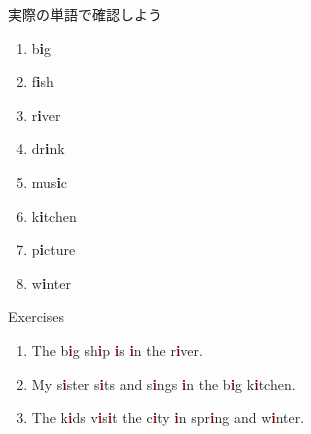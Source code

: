 \documentclass[aspectratio=169,xcolor={dvipsnames,table}]{beamer}
\begin{document}
\begin{frame}[plain]{実際の単語で確認しよう}
\LARGE

\begin{enumerate}
 \item b\textcolor{NavyBlue}{\bfseries i}g%
\hfill{}\hspace{150pt}\mbox{}
 \item f\textcolor{NavyBlue}{\bfseries i}sh%
\hfill{}\hspace{150pt}\mbox{}
 \item r\textcolor{NavyBlue}{\bfseries i}ver%
\hfill{}\hspace{150pt}\mbox{}
 \item dr\textcolor{NavyBlue}{\bfseries i}nk%
\hfill{}\hspace{150pt}\mbox{}
 \item mus\textcolor{NavyBlue}{\bfseries i}c%
\hfill{}\hspace{150pt}\mbox{} 
\item k\textcolor{NavyBlue}{\bfseries i}tchen%
\hfill{}\hspace{150pt}\mbox{}
 \item p\textcolor{NavyBlue}{\bfseries i}cture%
\hfill{}\hspace{150pt}\mbox{}
 \item w\textcolor{NavyBlue}{\bfseries i}nter%
\hfill{}\hspace{150pt}\mbox{}
\end{enumerate}
\end{frame}
\begin{frame}[plain]{Exercises}
\LARGE

\begin{enumerate}
 \item The b\textcolor{Maroon}{\bfseries i}g sh\textcolor{Maroon}{\bfseries i}p \textcolor{Maroon}{\bfseries i}s \textcolor{Maroon}{\bfseries i}n the r\textcolor{Maroon}{\bfseries i}ver.
 \item My s\textcolor{Maroon}{\bfseries i}ster s\textcolor{Maroon}{\bfseries i}ts and s\textcolor{Maroon}{\bfseries i}ngs \textcolor{Maroon}{\bfseries i}n the b\textcolor{Maroon}{\bfseries i}g k\textcolor{Maroon}{\bfseries i}tchen.
 \item The k\textcolor{Maroon}{\bfseries i}ds v\textcolor{Maroon}{\bfseries i}s\textcolor{Maroon}{\bfseries i}t the c\textcolor{Maroon}{\bfseries i}ty \textcolor{Maroon}{\bfseries i}n spr\textcolor{Maroon}{\bfseries i}ng and w\textcolor{Maroon}{\bfseries i}nter.

\end{enumerate}
\end{frame}
\end{document}
